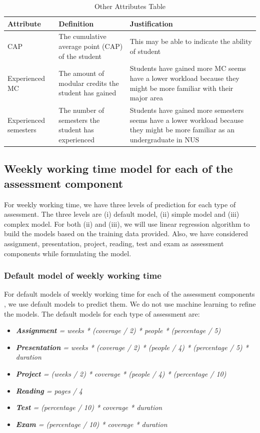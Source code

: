 \documentclass[fyp]{socreport}
\begin{document}
\begin{table}[]
\centering
\begin{tabular}{|p{}|p{}|p{}|}
\hline
	\rowcolor[HTML]{C0C0C0}
	\textbf{Attribute} & \textbf{Definition} & \textbf{Justification} \\
\hline
CAP & The cumulative average point (CAP) of the student & This may be able to indicate the ability of student \\
\hline
Experienced MC & The amount of modular credits the student has gained & Students have gained more MC seems have a lower workload because they might be more familiar with their major area \\
\hline
Experienced semesters & The number of semesters the student has experienced & Students have gained more semesters seems have a lower workload because they might be more familiar as an undergraduate in NUS \\
\hline
\end{tabular}
\caption{Other Attributes Table}
\label{other-attribute}
\end{table}

\subsection{Weekly working time model for each of the assessment component}
For weekly working time, we have three levels of prediction for each type of assessment. The three levels are (i) default model, (ii) simple model and (iii) complex model. For both (ii) and (iii), we will use linear regression algorithm to build the models based on the training data provided. Also, we have considered assignment, presentation, project, reading, test and exam as assessment components while formulating the model.

\subsubsection{Default model of weekly working time}
For default models of weekly working time for each of the assessment components , we use default models to predict them. We do not use machine learning to refine the models. The default models for each type of assessment are:
\begin{itemize}
	\item \textit{\textbf{Assignment} = weeks * (coverage / 2) * people * (percentage / 5)}
	\item \textit{\textbf{Presentation} = weeks * (coverage / 2) * (people / 4) * (percentage / 5) * duration}
	\item \textit{\textbf{Project} = (weeks / 2) * coverage * (people / 4) * (percentage / 10)}
	\item \textit{\textbf{Reading} = pages / 4}
	\item \textit{\textbf{Test} = (percentage / 10) * coverage * duration}
	\item \textit{\textbf{Exam} = (percentage / 10) * coverage * duration}
\end{itemize}
\end{document}
